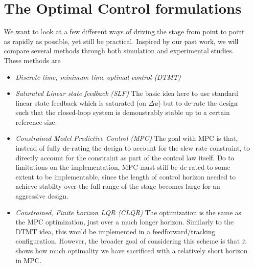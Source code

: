 \documentclass[journal,12pt,twocolumn,twoside]{IEEEtran/IEEEtran}
\begin{document}
\section{The Optimal Control formulations}
We want to look at a few different ways of driving the stage from point to point as rapidly as possible, yet still be practical. Inspired by our past work, we will compare several methods through both simulation and experimental studies. These methods are
\begin{itemize}
\item\emph{Discrete time, minimum time optimal control (DTMT)}
\item\emph{Saturated Linear state feedback (SLF)} The basic idea here to use standard linear state feedback which is saturated (on $\Delta u$) but to de-rate the design such that the closed-loop system is demonstrably stable up to a certain reference size. 
\item\emph{Constrained Model Predictive Control (MPC)} The goal with MPC is that, instead of fully de-rating the design to account for the slew rate constraint, to directly account for the constraint as part of the control law itself. Do to limitations on the implementation, MPC must still be de-rated to some extent to be implementable, since the length of control horizon needed to achieve stabilty over the full range of the stage becomes large for an aggressive design.
\item\emph{Constrained, Finite horizon LQR (CLQR)} The optimization is the same as the MPC optimization, just over a much longer horizon. Similarly to the DTMT idea, this would be implemented in a feedforward/tracking configuration. However, the broader goal of considering this scheme is that it shows how much optimality we have sacrificed with a relatively short horizon in MPC.
\end{itemize}
\end{document}
